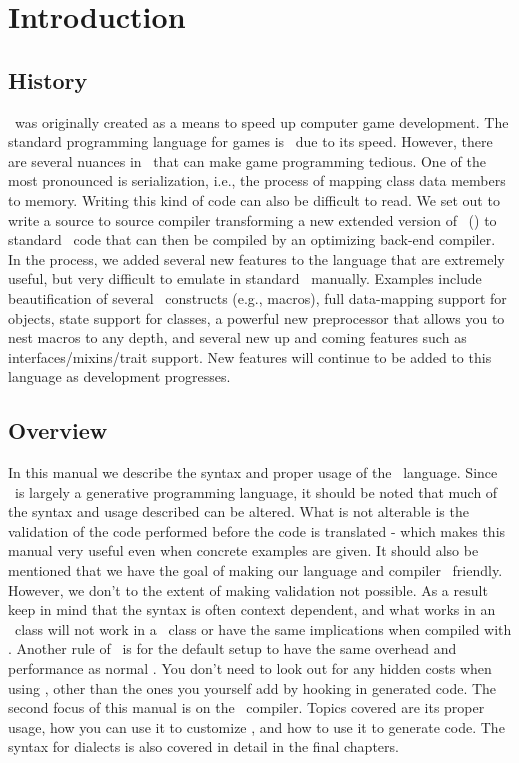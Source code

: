 
\chapter{Introduction}
\label{chap:introduction}

\section{History}

\opCPP\ was originally created as a means to speed up computer game development.  The standard programming language for games is \cpp\ due to its speed.  However, there are several nuances in \cpp\ that can make game programming tedious.  One of the most pronounced is serialization, i.e., the process of mapping class data members to memory.  Writing this kind of code can also be difficult to read.  We set out to write a source to source compiler transforming a new extended version of \cpp\ (\opCPP) to standard \cpp\ code that can then be compiled by an optimizing back-end compiler.  In the process, we added several new features to the language that are extremely useful, but very difficult to emulate in standard \cpp\ manually.  Examples include beautification of several \cpp\ constructs (e.g., macros), full data-mapping support for objects, state support for classes, a powerful new preprocessor that allows you to nest macros to any depth, and several new up and coming features such as interfaces/mixins/trait support.  New features will continue to be added to this language as development progresses.

\section{Overview}

In this manual we describe the syntax and proper usage of the \opCPP\ language.  Since \opCPP\ is largely a generative programming language, it should be noted that much of the syntax and usage described can be altered.  What is not alterable is the validation of the code performed before the code is translated - which makes this manual very useful even when concrete examples are given.  It should also be mentioned that we have the goal of making our language and compiler \cpp\ friendly.  However, we don't to the extent of making validation not possible.  As a result keep in mind that the syntax is often context dependent, and what works in an \opCPP\ class will not work in a \cpp\ class or have the same implications when compiled with \opCPP.  Another rule of \opCPP\ is for the default setup to have the same overhead and performance as normal \cpp.  You don't need to look out for any hidden costs when using \opCPP, other than the ones you yourself add by hooking in generated code.  The second focus of this manual is on the \opCPP\ compiler.  Topics covered are its proper usage, how you can use it to customize \opCPP, and how to use it to generate code.  The syntax for dialects is also covered in detail in the final chapters.
